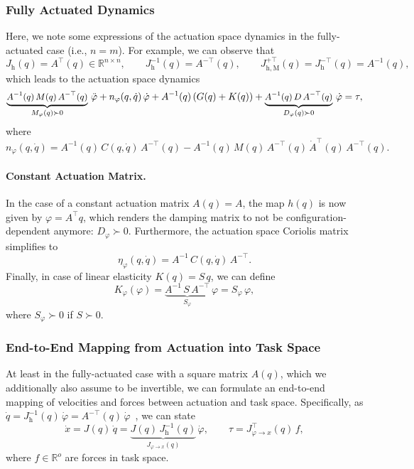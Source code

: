 \subsubsection{Fully Actuated Dynamics}
Here, we note some expressions of the actuation space dynamics in the fully-actuated case (i.e., $n=m$).
For example, we can observe that
\begin{equation}
    J_\mathrm{h}(q) = A^\top(q) \in \mathbb{R}^{n \times n},
    \qquad
    J_\mathrm{h}^{-1}(q) = A^{-\top}(q),
    \qquad
    J_{\mathrm{h},\mathrm{M}}^{+\top}(q) = J_\mathrm{h}^{-\top}(q) = A^{-1}(q),
\end{equation}
which leads to the actuation space dynamics
\begin{equation}\small
    \underbrace{A^{-1}(q) \, M(q) \, A^{-\top}(q)}_{M_\varphi(q) \succ 0} \, \ddot{\varphi} + n_\varphi(q,\dot{q}) \, \dot{\varphi} + A^{-1}(q) \left ( G(q) + K(q) \right ) + \underbrace{A^{-1} (q) \, D \, A^{-\top} (q)}_{D_\varphi(q) \succ 0} \, \dot{\varphi} = \tau,
\end{equation}
where
\begin{equation}
    n_\varphi(q,\dot{q}) = A^{-1}(q) \, C(q,\dot{q}) \, A^{-\top}(q) - A^{-1}(q) \, M(q) \, A^{-\top}(q) \, \dot{A}^\top(q) \, A^{-\top} (q).
\end{equation}

\paragraph{Constant Actuation Matrix.} In the case of a constant actuation matrix $A(q) = A$, the map $h(q)$ is now given by $\varphi = A^\top q$, which renders the damping matrix to not be configuration-dependent anymore: $D_\varphi \succ 0$. Furthermore, the actuation space Coriolis matrix simplifies to
\begin{equation}
    \eta_\varphi(q,\dot{q}) = A^{-1} \, C(q,\dot{q}) \, A^{-\top}.
\end{equation}
Finally, in case of linear elasticity $K(q) = S \, q$, we can define
\begin{equation}
    K_\varphi(\varphi) = \underbrace{A^{-1} \, S \, A^{-\top}}_{S_\varphi} \, \varphi = S_\varphi \, \varphi,
\end{equation}
where $S_\varphi \succ 0$ if $S \succ 0$.

\subsubsection{End-to-End Mapping from Actuation into Task Space}
At least in the fully-actuated case with a square matrix $A(q)$, which we additionally also assume to be invertible, we can formulate an end-to-end mapping of velocities and forces between actuation and task space.
Specifically, as $\dot{q} = J_\mathrm{h}^{-1}(q) \, \dot{\varphi} = A^{-\top}(q) \, \dot{\varphi}$~\citep{pustina2024input}, we can state
\begin{equation}
    \dot{x} = J(q) \, \dot{q} = \underbrace{J(q) \, J_\mathrm{h}^{-1}(q) }_{J_{\varphi \to x}(q)} \, \dot{\varphi},
    \qquad
    \tau = J_{\varphi \to x}^\top(q) \, f,
\end{equation}
where $f \in \mathbb{R}^{o}$ are forces in task space. 